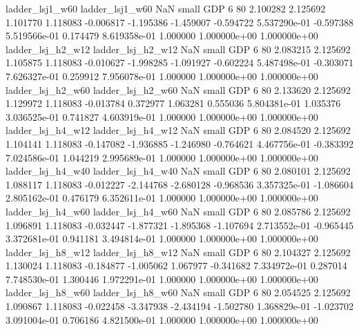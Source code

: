          ladder_lsj1_w60          ladder_lsj1_w60                   NaN      small      GDP                 6 80 2.100282       2.125692 1.101770       1.118083   -0.006817     -1.195386     -1.459007    -0.594722   5.537290e-01 -0.597388 5.519566e-01     0.174479   8.619358e-01            1.000000    1.000000e+00        1.000000e+00
       ladder_lsj_h2_w12        ladder_lsj_h2_w12                   NaN      small      GDP                 6 80 2.083215       2.125692 1.105875       1.118083   -0.010627     -1.998285     -1.091927    -0.602224   5.487498e-01 -0.303071 7.626327e-01     0.259912   7.956078e-01            1.000000    1.000000e+00        1.000000e+00
       ladder_lsj_h2_w60        ladder_lsj_h2_w60                   NaN      small      GDP                 6 80 2.133620       2.125692 1.129972       1.118083   -0.013784      0.372977      1.063281     0.555036   5.804381e-01  1.035376 3.036525e-01     0.741827   4.603919e-01            1.000000    1.000000e+00        1.000000e+00
       ladder_lsj_h4_w12        ladder_lsj_h4_w12                   NaN      small      GDP                 6 80 2.084520       2.125692 1.104141       1.118083   -0.147082     -1.936885     -1.246980    -0.764621   4.467756e-01 -0.383392 7.024586e-01     1.044219   2.995689e-01            1.000000    1.000000e+00        1.000000e+00
       ladder_lsj_h4_w40        ladder_lsj_h4_w40                   NaN      small      GDP                 6 80 2.080101       2.125692 1.088117       1.118083   -0.012227     -2.144768     -2.680128    -0.968536   3.357325e-01 -1.086604 2.805162e-01     0.476179   6.352611e-01            1.000000    1.000000e+00        1.000000e+00
       ladder_lsj_h4_w60        ladder_lsj_h4_w60                   NaN      small      GDP                 6 80 2.085786       2.125692 1.096891       1.118083   -0.032447     -1.877321     -1.895368    -1.107694   2.713552e-01 -0.965445 3.372681e-01     0.941181   3.494814e-01            1.000000    1.000000e+00        1.000000e+00
       ladder_lsj_h8_w12        ladder_lsj_h8_w12                   NaN      small      GDP                 6 80 2.104327       2.125692 1.130024       1.118083   -0.184877     -1.005062      1.067977    -0.341682   7.334972e-01  0.287014 7.748530e-01     1.300446   1.972291e-01            1.000000    1.000000e+00        1.000000e+00
       ladder_lsj_h8_w60        ladder_lsj_h8_w60                   NaN      small      GDP                 6 80 2.054525       2.125692 1.090867       1.118083   -0.022458     -3.347938     -2.434194    -1.502780   1.368829e-01 -1.023702 3.091004e-01     0.706186   4.821500e-01            1.000000    1.000000e+00        1.000000e+00
